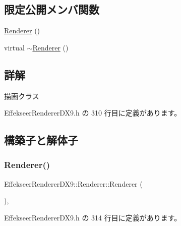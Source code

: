 \subsection*{限定公開メンバ関数}
\begin{DoxyCompactItemize}
\item 
\mbox{\hyperlink{class_effekseer_renderer_d_x9_1_1_renderer_a60053d4f038d75ec542de6643dd06cff}{Renderer}} ()
\item 
virtual \mbox{\hyperlink{class_effekseer_renderer_d_x9_1_1_renderer_ab0f89bf1d5ba64f8b661babb340a5d2c}{$\sim$\+Renderer}} ()
\end{DoxyCompactItemize}


\subsection{詳解}
描画クラス 

 Effekseer\+Renderer\+D\+X9.\+h の 310 行目に定義があります。



\subsection{構築子と解体子}
\mbox{\label{class_effekseer_renderer_d_x9_1_1_renderer_a60053d4f038d75ec542de6643dd06cff}} 
\subsubsection{\texorpdfstring{Renderer()}{Renderer()}}
{\footnotesize\ttfamily Effekseer\+Renderer\+D\+X9\+::\+Renderer\+::\+Renderer (\begin{DoxyParamCaption}{ }\end{DoxyParamCaption})\hspace{0.3cm}{\ttfamily [inline]}, {\ttfamily [protected]}}



 Effekseer\+Renderer\+D\+X9.\+h の 314 行目に定義があります。

\mbox{\label{class_effekseer_renderer_d_x9_1_1_renderer_ab0f89bf1d5ba64f8b661babb340a5d2c}} 
